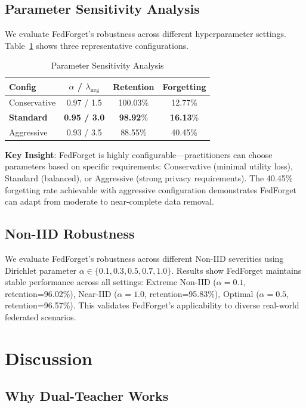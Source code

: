 \documentclass[10pt,twocolumn]{article}
\begin{document}
\subsection{Parameter Sensitivity Analysis}

We evaluate FedForget's robustness across different hyperparameter settings. Table~\ref{tab:params} shows three representative configurations.

\begin{table}[htbp]
\centering
\caption{Parameter Sensitivity Analysis}
\label{tab:params}
\begin{tabular}{lccc}
\toprule
Config & $\alpha$ / $\lambda_{\text{neg}}$ & Retention & Forgetting \\
\midrule
Conservative & 0.97 / 1.5 & 100.03\% & 12.77\% \\
\textbf{Standard} & \textbf{0.95 / 3.0} & \textbf{98.92}\% & \textbf{16.13}\% \\
Aggressive & 0.93 / 3.5 & 88.55\% & 40.45\% \\
\bottomrule
\end{tabular}
\end{table}

\textbf{Key Insight}: FedForget is highly configurable---practitioners can choose parameters based on specific requirements: Conservative (minimal utility loss), Standard (balanced), or Aggressive (strong privacy requirements). The 40.45\% forgetting rate achievable with aggressive configuration demonstrates FedForget can adapt from moderate to near-complete data removal.

\subsection{Non-IID Robustness}

We evaluate FedForget's robustness across different Non-IID severities using Dirichlet parameter $\alpha \in \{0.1, 0.3, 0.5, 0.7, 1.0\}$. Results show FedForget maintains stable performance across all settings: Extreme Non-IID ($\alpha=0.1$, retention=96.02\%), Near-IID ($\alpha=1.0$, retention=95.83\%), Optimal ($\alpha=0.5$, retention=96.57\%). This validates FedForget's applicability to diverse real-world federated scenarios.

\section{Discussion}

\subsection{Why Dual-Teacher Works}
\end{document}
